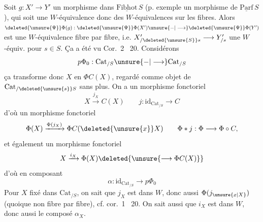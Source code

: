 Soit \quad $g:X'\longrightarrow Y'$
un morphisme dans $\underline{\mathrm{Fibhot}}\,S$ (p. exemple un morphisme de $\underline{\mathrm{Parf}}\,S$), qui soit une $W$-équivalence donc des $W$-équivalences sur les fibres. Alors $\deleted{\unsure{\Psi}}\Phi(g):\deleted{\unsure{\Psi}}\Phi(X')\unsure{\mathord{-}|\longrightarrow}\deleted{\unsure{\Psi}}\Phi(Y')$ est une $W$-équivalence fibre par fibre,
i.e. \quad $X'_{/\deleted{\unsure{S}}s}\longrightarrow Y'_{/s}$ une $W$-équiv. pour  $s\in S$. Ça a été vu  Cor.~2 ~20.
Considérons
\[
 p\Phi_0:\mathrm{Cat}_{/S}\unsure{\mathord{-}|\longrightarrow}\mathrm{Cat}_{/S}
\]
ça transforme donc $X$ en $\Phi C(X)$, regardé comme objet de $\mathrm{Cat}_{/\deleted{\unsure{s}}S}$ sans plus. On a un morphisme fonctoriel
\[
 X\xrightarrow{j_X} C(X)\qquad j:\mathrm{id}_{\mathrm{Cat}_{/S}}\longrightarrow C
\]
d'où un morphisme fonctoriel
\[
 \Phi(X)\xrightarrow{\Phi(j_X)}\Phi C(\deleted{\unsure{x}}X)\qquad
 \Phi*j:\Phi\longrightarrow\Phi\circ C,
\]
et également un morphisme fonctoriel
\[
 X\xrightarrow{i_X}\Phi(X)\deleted{\unsure{\longrightarrow\Phi C(X)}}
\]
d'où en composant
\[
 \alpha:\mathrm{id}_{\mathrm{Cat}_{/S}}\longrightarrow p\Phi_0
\]
Pour $X$ fixé dans $\mathrm{Cat}_{/S}$, on sait que $j_X$ est dans $W$, donc aussi $\Phi(j_{\unsure{x|X}})$ (quoique non fibre par fibre), cf. cor.~1 ~20. On sait aussi que $i_X$ est dans $W$, donc aussi  le composé $\alpha_X$.

